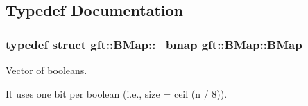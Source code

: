 \subsection{Typedef Documentation}
\hypertarget{namespacegft_1_1BMap_a8f2cf1208156e700ed4ee3266e9608a3}{
\subsubsection[{B\-Map}]{\setlength{\rightskip}{0pt plus 5cm}typedef struct {\bf gft\-::\-B\-Map\-::\-\_\-bmap}  {\bf gft\-::\-B\-Map\-::\-B\-Map}}}\label{namespacegft_1_1BMap_a8f2cf1208156e700ed4ee3266e9608a3}


Vector of booleans. 

It uses one bit per boolean (i.\-e., size = ceil (n / 8)). 

